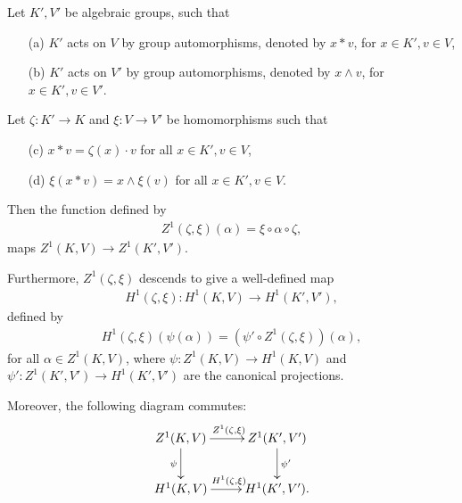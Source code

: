\begin{lemma} \label{h1maps} Let $K', V'$ be algebraic groups, such that
	\begin{itemize}
		\item[(a)] $K'$ acts on $V$ by group automorphisms, denoted by $x \ast v$, for $x \in K', v \in V$,
		\item[(b)] $K'$ acts on $V'$ by group automorphisms, denoted by $x \wedge v$, for $x \in K', v \in V'$.
	\end{itemize}
	Let $\zeta:K' \rightarrow K$ and $\xi: V \rightarrow V'$ be homomorphisms such that
	\begin{itemize}
		\item[(c)] $x \ast v = \zeta(x) \cdot v$ for all $x \in K', v \in V$,
		\item[(d)] $\xi(x \ast v) = x \wedge \xi(v)$ for all $x \in K', v \in V$.
	\end{itemize}
	Then the function defined by
	\begin{align*}
		Z^1(\zeta, \xi)(\alpha) = \xi \circ \alpha \circ \zeta,
	\end{align*}
	maps $Z^1(K, V) \rightarrow Z^1(K', V')$.

	Furthermore, $Z^1(\zeta, \xi)$ descends to give a well-defined map
	\begin{align*}
		H^1(\zeta, \xi):H^1(K, V) \rightarrow H^1(K', V'),
	\end{align*}
	defined by
	\begin{align*}
		H^1(\zeta, \xi)(\psi(\alpha)) = \left(\psi' \circ Z^1(\zeta, \xi)\right)(\alpha),
	\end{align*}
	for all $\alpha \in Z^1(K, V)$, where $\psi:Z^1(K, V)\rightarrow H^1(K, V)$ and $\psi':Z^1(K', V') \rightarrow H^1(K', V')$ are the canonical projections.

	Moreover, the following diagram commutes:
	\begin{align*}
		\xymatrix{
			Z^1(K, V) \ar[r]^{Z^1(\zeta, \xi)} \ar[d]_{\psi} & Z^1(K', V') \ar[d]^{\psi'} \\
			H^1(K, V) \ar[r]^{H^1(\zeta, \xi)}               & H^1(K', V').
		}
	\end{align*}
\end{lemma}
